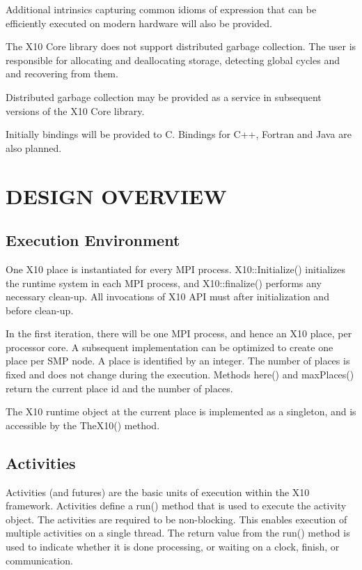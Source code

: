 \documentclass{article}
\begin{document}
Additional intrinsics capturing common idioms of expression that can be
efficiently executed on modern hardware will also be provided.

The X10 Core library does not support distributed garbage
collection. The user is responsible for allocating and deallocating
storage, detecting global cycles and and recovering from
them. 

Distributed garbage collection may be provided as a service in
subsequent versions of the X10 Core library.

Initially bindings will be provided to C. Bindings for C++, Fortran
and Java are also planned.

\section{DESIGN OVERVIEW}

\subsection{Execution Environment}

One X10 place is instantiated for every MPI process. X10::Initialize()
initializes the runtime system in each MPI process, and
X10::finalize() performs any necessary clean-up. All invocations of
X10 API must after initialization and before clean-up.

In the first iteration, there will be one MPI process, and hence an
X10 place, per processor core. A subsequent implementation can be
optimized to create one place per SMP node. A place is identified by
an integer. The number of places is fixed and does not change during
the execution. Methods here() and maxPlaces() return the current place
id and the number of places.

The X10 runtime object at the current place is implemented as a
singleton, and is accessible by the TheX10() method.

\subsection{Activities}

Activities (and futures) are the basic units of execution within the
X10 framework. Activities define a run() method that is used to
execute the activity object. The activities are required to be
non-blocking. This enables execution of multiple activities on a
single thread. The return value from the run() method is used to
indicate whether it is done processing, or waiting on a clock, finish,
or communication. 
\end{document}
